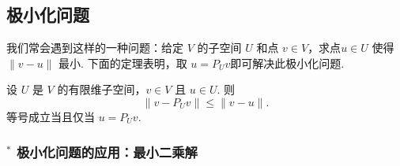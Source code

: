 \subsection{极小化问题}

我们常会遇到这样的一种问题：给定 $ V $ 的子空间 $ U $ 和点 $ v \in V $，求点$ u \in U $ 使得 $ \lVert v - u \rVert $ 最小. 下面的定理表明，取 $ u = P_U v$即可解决此极小化问题.

\begin{theorem}
    设 $ U $ 是 $ V $ 的有限维子空间，$ v \in V $ 且 $ u \in U $. 则
    \[\lVert v - P_U v \rVert \leqslant \lVert v - u \rVert. \]
    等号成立当且仅当 $ u = P_U v $.
\end{theorem}

\subsubsection*{$^*$ 极小化问题的应用：最小二乘解}

